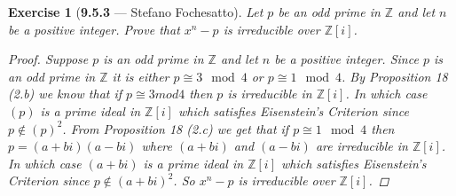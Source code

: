 \documentclass[12pt]{amsart}
\newtheorem{exercise}[theorem]{Exercise}
\theoremstyle{remark}
\newcommand{\ZZ}{{\mathbb Z}}
\theoremstyle{mycomment}
\begin{document}
\begin{exercise}[\textbf{9.5.3} --- Stefano Fochesatto] Let $p$ be an odd prime in $\ZZ$ and let $n$ be a positive integer. Prove that $x^n - p$ is irreducible over $\ZZ[i]$.
  \begin{proof} Suppose $p$ is an odd prime in $\ZZ$ and let $n$ be a positive integer. Since $p$ is an odd prime in $\ZZ$ it is either $p \cong 3 \mod 4$ or 
    $p \cong 1 \mod 4$. By Proposition 18 (2.b) we know that if $p \cong 3 mod 4$ then $p$ is irreducible in $\ZZ[i]$. In which case $(p)$ is a prime ideal in $\ZZ[i]$
    which satisfies Eisenstein's Criterion since $p \not\in (p)^2$. From Proposition 18 (2.c) we get that if
    $p \cong 1 \mod 4$ then $p = (a + bi)(a - bi)$ where $(a + bi)$ and $(a - bi)$ are irreducible in $\ZZ[i]$. In which case $(a + bi)$ is a prime ideal in $\ZZ[i]$
    which satisfies Eisenstein's Criterion since $p \not\in (a + bi)^2$. So $x^n - p$ is irreducible over $\ZZ[i]$.
    \end{proof}
\end{exercise}
\vspace{.5in}
\end{document}
